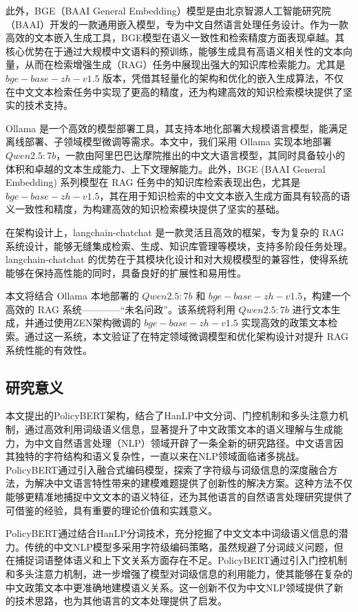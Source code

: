 \documentclass[12pt, a4paper]{ctexart}
\begin{document}
此外，BGE（BAAI General Embedding）模型是由北京智源人工智能研究院（BAAI）开发的一款通用嵌入模型，专为中文自然语言处理任务设计\cite{bge_embedding}。作为一款高效的文本嵌入生成工具，BGE模型在语义一致性和检索精度方面表现卓越。其核心优势在于通过大规模中文语料的预训练，能够生成具有高语义相关性的文本向量，从而在检索增强生成（RAG）任务中展现出强大的知识库检索能力。尤其是 $bge-base-zh-v1.5$ 版本，凭借其轻量化的架构和优化的嵌入生成算法，不仅在中文文本检索任务中实现了更高的精度，还为构建高效的知识检索模块提供了坚实的技术支持。

Ollama 是一个高效的模型部署工具，其支持本地化部署大规模语言模型，能满足离线部署、子领域模型微调等需求。本文中，我们采用 Ollama 实现本地部署 $Qwen2.5:7b$，一款由阿里巴巴达摩院推出的中文大语言模型，其同时具备较小的体积和卓越的文本生成能力、上下文理解能力\cite{qwen2.5}。此外，BGE (BAAI General Embedding) 系列模型在 RAG 任务中的知识库检索表现出色，尤其是 $ bge-base-zh-v1.5 $，其在用于知识检索的中文文本嵌入生成方面具有较高的语义一致性和精度，为构建高效的知识检索模块提供了坚实的基础。

在架构设计上，langchain-chatchat 是一款灵活且高效的框架，专为复杂的 RAG 系统设计，能够无缝集成检索、生成、知识库管理等模块，支持多阶段任务处理\cite{langchainchatchat}。langchain-chatchat 的优势在于其模块化设计和对大规模模型的兼容性，使得系统能够在保持高性能的同时，具备良好的扩展性和易用性。

本文将结合 Ollama 本地部署的 $Qwen2.5:7b$ 和 $ bge-base-zh-v1.5 $，构建一个高效的 RAG 系统————“未名问政”。该系统将利用 $Qwen2.5:7b$ 进行文本生成，并通过使用ZEN架构微调的 $ bge-base-zh-v1.5 $ 实现高效的政策文本检索。通过这一系统，本文验证了在特定领域微调模型和优化架构设计对提升 RAG 系统性能的有效性。

\subsection{研究意义}
本文提出的PolicyBERT架构，结合了HanLP中文分词、门控机制和多头注意力机制，通过高效利用词级语义信息，显著提升了中文政策文本的语义理解与生成能力，为中文自然语言处理（NLP）领域开辟了一条全新的研究路径。中文语言因其独特的字符结构和语义复杂性，一直以来在NLP领域面临诸多挑战。PolicyBERT通过引入融合式编码模型，探索了字符级与词级信息的深度融合方法，为解决中文语言特性带来的建模难题提供了创新性的解决方案。这种方法不仅能够更精准地捕捉中文文本的语义特征，还为其他语言的自然语言处理研究提供了可借鉴的经验，具有重要的理论价值和实践意义。

PolicyBERT通过结合HanLP分词技术，充分挖掘了中文文本中词级语义信息的潜力。传统的中文NLP模型多采用字符级编码策略，虽然规避了分词歧义问题，但在捕捉词语整体语义和上下文关系方面存在不足。PolicyBERT通过引入门控机制和多头注意力机制，进一步增强了模型对词级信息的利用能力，使其能够在复杂的中文政策文本中更准确地建模语义关系。这一创新不仅为中文NLP领域提供了新的技术思路，也为其他语言的文本处理提供了启发。
\end{document}
